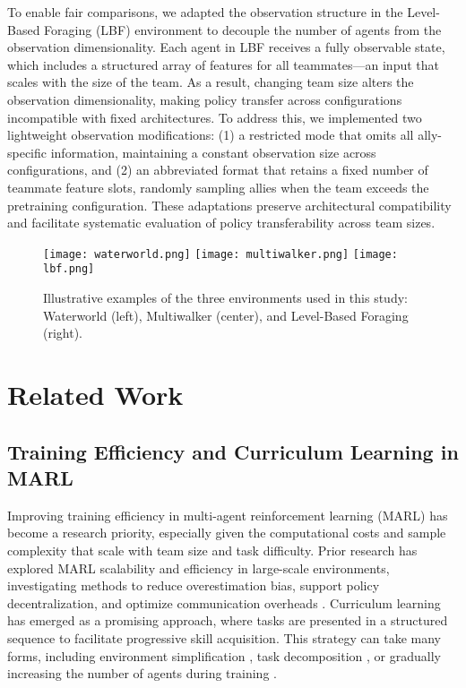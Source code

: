 \documentclass{article}
\begin{document}
To enable fair comparisons, we adapted the observation structure in the Level-Based Foraging (LBF) 
environment to decouple the number of agents from the observation dimensionality. 
Each agent in LBF receives a fully observable state, which includes a structured array of 
features for all teammates—an input that scales with the size of the team. As a result, changing 
team size alters the observation dimensionality, making policy transfer across configurations 
incompatible with fixed architectures. To address this, we implemented two lightweight 
observation modifications: (1) a restricted mode that omits all ally-specific information, 
maintaining a constant observation size across configurations, 
and (2) an abbreviated format that retains a fixed number of teammate feature slots, 
randomly sampling allies when the team exceeds the pretraining configuration. 
These adaptations preserve architectural compatibility and facilitate systematic 
evaluation of policy transferability across team sizes.

\begin{figure}[h]
    \centering
    \texttt{[image: waterworld.png]}
    \hfill
    \texttt{[image: multiwalker.png]}
    \hfill
    \texttt{[image: lbf.png]}
    \caption{Illustrative examples of the three environments used in this study: Waterworld (left), Multiwalker (center), and Level-Based Foraging (right).}
    \label{fig:envs-overview}
\end{figure}


\section{Related Work}
\subsection{Training Efficiency and Curriculum Learning in MARL}

Improving training efficiency in multi-agent reinforcement learning (MARL) has become a research 
priority, especially given the computational costs and sample complexity that scale with team 
size and task difficulty. Prior research has explored MARL scalability and efficiency in 
large-scale environments, investigating methods to reduce overestimation bias, 
support policy decentralization, and optimize communication overheads 
\cite{shoham2007a, busoniu2008, foerster2017, ackermann2019, lowe2020}.
Curriculum learning has emerged as a promising approach, where tasks are presented in a structured 
sequence to facilitate progressive skill acquisition. This strategy can take many forms, 
including environment simplification \cite{shukla2022}, task decomposition \cite{shi2023}, 
or gradually increasing the number of agents during training \cite{smit2023, albrecht2024}.
\end{document}

